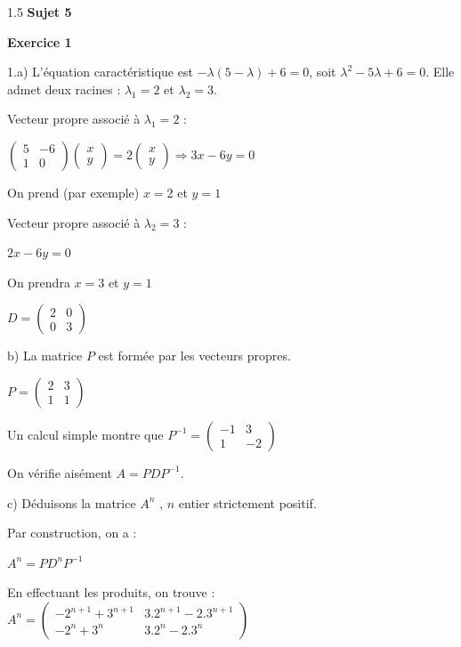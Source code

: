 \documentclass[12pt]{article}
\begin{document}
\begin{spacing}{1.5}
\medskip\textbf{Sujet 5}

\textbf{Exercice 1}

1.a) L'équation caractéristique est $-\lambda(5-\lambda) + 6 = 0$, soit $\lambda^2 - 5\lambda + 6 = 0$. Elle admet deux racines : $\lambda_1 = 2$ et 
$\lambda_2 = 3$. 

Vecteur propre associé à $\lambda_1 = 2$ : 

$\begin{pmatrix}
5 & -6 \\
1 & 0
\end{pmatrix}\begin{pmatrix}
x \\
y
\end{pmatrix}=2\begin{pmatrix}
x\\
y
\end{pmatrix}\Longrightarrow 3x-   6y = 0$

On prend (par exemple) $x = 2$ et $y = 1$

Vecteur propre associé à $\lambda_2 = 3$ : 

$2x-6y = 0 $

On prendra $x = 3$ et $y = 1$

$D= \begin{pmatrix}
2 & 0 \\
0 & 3
\end{pmatrix}$

b) La matrice $P$ est formée par les vecteurs propres. 

$P=\begin{pmatrix}
2 & 3 \\
1 & 1
\end{pmatrix}$

Un calcul simple montre que $P^{-1}=\begin{pmatrix}
-1 & 3 \\
1 & -2
\end{pmatrix}$

On vérifie aisément $A=PDP^{-1}$.

c) Déduisons la matrice $A^n$
, $n$ entier strictement positif. 

Par construction, on a : 

$A^n= PD^nP^{-1}$

En effectuant les produits, on trouve : 
$
A^n=\begin{pmatrix}
-2^{ n+1}+3^{n+1} & 3.2^{n+1}-2.3^{n+1} \\
-2^{ n}+3^{n} & 3.2^{n}-2.3^{n}
\end{pmatrix}
$


\end{spacing}
\end{document}
